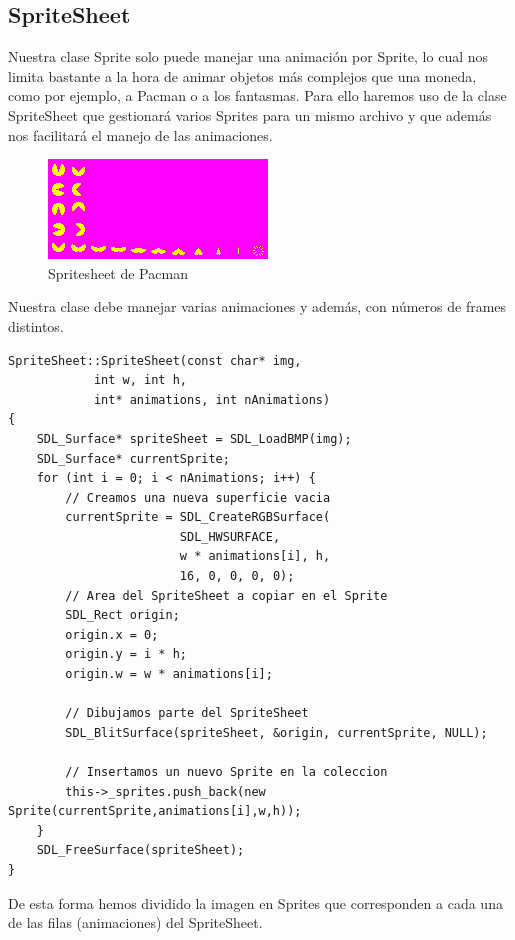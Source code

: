 \documentclass[parskip=half*]{scrartcl}
\begin{document}
	\subsection{SpriteSheet}
		Nuestra clase Sprite solo puede manejar una animaci\'on por Sprite, lo cual nos limita bastante a la hora de animar objetos m\'as complejos que una moneda, como por ejemplo, a Pacman o a los fantasmas. Para ello haremos uso de la clase SpriteSheet que gestionar\'a varios Sprites para un mismo archivo y que adem\'as nos facilitar\'a el manejo de las animaciones.

		\begin{figure}
			\centering
			\includegraphics{MulticocoSDL/img/pacman_example.png}
			\caption{Spritesheet de Pacman}
		\end{figure}

		Nuestra clase debe manejar varias animaciones y adem\'as, con n\'umeros de frames distintos.

		\begin{verbatim}
SpriteSheet::SpriteSheet(const char* img,
			int w, int h,
			int* animations, int nAnimations)
{  
    SDL_Surface* spriteSheet = SDL_LoadBMP(img);    
    SDL_Surface* currentSprite;
    for (int i = 0; i < nAnimations; i++) {
        // Creamos una nueva superficie vacia
        currentSprite = SDL_CreateRGBSurface(
        				SDL_HWSURFACE,
        				w * animations[i], h,
        				16, 0, 0, 0, 0);        
        // Area del SpriteSheet a copiar en el Sprite
        SDL_Rect origin;
        origin.x = 0;
        origin.y = i * h;
        origin.w = w * animations[i];   

        // Dibujamos parte del SpriteSheet
        SDL_BlitSurface(spriteSheet, &origin, currentSprite, NULL);

        // Insertamos un nuevo Sprite en la coleccion
        this->_sprites.push_back(new Sprite(currentSprite,animations[i],w,h));
    }
    SDL_FreeSurface(spriteSheet);    
}
		\end{verbatim}

		De esta forma hemos dividido la imagen en Sprites que corresponden a cada una de las filas (animaciones) del SpriteSheet.
\end{document}
